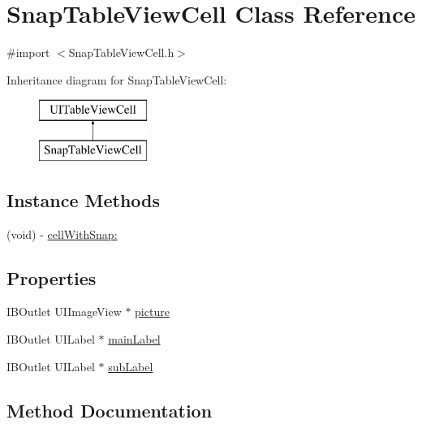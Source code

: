 \hypertarget{interface_snap_table_view_cell}{}\section{Snap\+Table\+View\+Cell Class Reference}
\label{interface_snap_table_view_cell}


{\ttfamily \#import $<$Snap\+Table\+View\+Cell.\+h$>$}

Inheritance diagram for Snap\+Table\+View\+Cell\+:\begin{figure}[H]
\begin{center}
\leavevmode
\includegraphics[height=2.000000cm]{interface_snap_table_view_cell}
\end{center}
\end{figure}
\subsection*{Instance Methods}
\begin{DoxyCompactItemize}
\item 
(void) -\/ \hyperlink{interface_snap_table_view_cell_a43ea287bdfb75b339f76da020ff89c91}{cell\+With\+Snap\+:}
\end{DoxyCompactItemize}
\subsection*{Properties}
\begin{DoxyCompactItemize}
\item 
I\+B\+Outlet U\+I\+Image\+View $\ast$ \hyperlink{interface_snap_table_view_cell_ab73d6988eec1b3c683f70f5974ce749c}{picture}
\item 
I\+B\+Outlet U\+I\+Label $\ast$ \hyperlink{interface_snap_table_view_cell_a472b0de8213a2c408bc18303972f0f7a}{main\+Label}
\item 
I\+B\+Outlet U\+I\+Label $\ast$ \hyperlink{interface_snap_table_view_cell_a01bcf70ecb074b7e89e67aeebe3de576}{sub\+Label}
\end{DoxyCompactItemize}


\subsection{Method Documentation}
\hypertarget{interface_snap_table_view_cell_a43ea287bdfb75b339f76da020ff89c91}{}\label{interface_snap_table_view_cell_a43ea287bdfb75b339f76da020ff89c91} 
